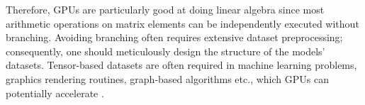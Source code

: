 Therefore, GPUs are particularly good at doing linear algebra \cite{PattersonARM, ParallelNVIDIA} since most arithmetic operations on matrix elements can be independently executed without branching. Avoiding branching often requires extensive dataset preprocessing; consequently, one should meticulously design the structure of the models' datasets. Tensor-based datasets are often required in machine learning problems, graphics rendering routines, graph-based algorithms etc., which GPUs can potentially accelerate \cite{PattersonARM}.